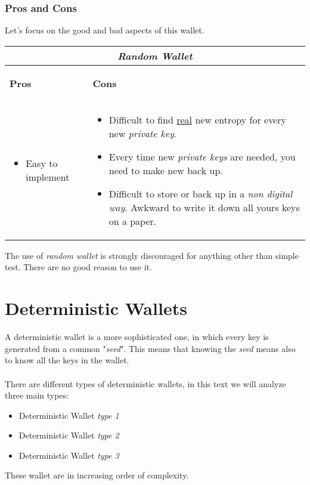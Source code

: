 \subsubsection{Pros and Cons}
Let's focus on the good and bad aspects of this wallet.

\begin{center}
	\begin{tabular}{ |p{6cm}|p{6cm}|  }
	\hline
	\multicolumn{2}{|c|}{\textbf{\textit{Random Wallet}}} \\
	\hline \hline 
	\begin{center}
		\textbf{Pros}
	\end{center}&\begin{center}
		\textbf{Cons}
	\end{center}\\
	\hline
	\begin{itemize}
		\item Easy to implement
	\end{itemize} &
	\begin{itemize}
		\item Difficult to find \underline{real} new entropy for every new \textit{private key}.
		\item Every time new \textit{private keys} are needed, you need to make new back up.
		\item Difficult to store or back up in a \textit{non digital way}. Awkward to write it down all yours keys on a paper.
	\end{itemize}\\
	\hline
\end{tabular}
\end{center}

The use of \textit{random wallet} is strongly discouraged for anything other than simple test. There are no good reason to use it.

\section{Deterministic Wallets}
A deterministic wallet is a more sophisticated one, in which every key is generated from a common "\textit{seed}". This means that knowing the \textit{seed} means also to know all the keys in the wallet.\\ \\
There are different types of deterministic wallets, in this text we will analyze three main types:
\begin{itemize}
	\item Deterministic Wallet \textit{type 1}
	\item Deterministic Wallet \textit{type 2}
	\item Deterministic Wallet \textit{type 3}
\end{itemize}
These wallet are in increasing order of complexity.

